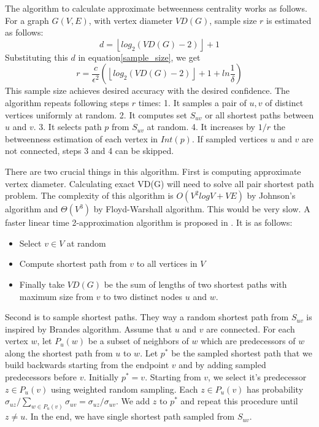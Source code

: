 \documentclass[runningheads,a4paper]{llncs}
\begin{document}
The algorithm to calculate approximate betweenness centrality works as follows. For a graph $G(V,E)$, with vertex diameter $VD(G)$, sample size $r$ is estimated as follows:
$$ d = \left\lfloor{log_{2}(VD(G) - 2)}\right\rfloor + 1$$
Substituting this $d$ in equation\ref{sample_size}, we get
\begin{equation} \label{sample_size_algo}
r = \frac{c}{\epsilon^{2}}(\left\lfloor{log_{2}(VD(G) - 2)}\right\rfloor + 1 + ln\frac{1}{\delta})
\end{equation}
This sample size achieves desired accuracy with the desired confidence. The algorithm repeats following steps $r$ times: 1. It samples a pair of $u,v$ of distinct vertices uniformly at random. 2. It computes set $S_{uv}$ or all shortest paths between $u$ and $v$. 3. It selects path $p$ from $S_{uv}$ at random. 4. It increases by $1/r$ the betweenness estimation of each vertex in $Int(p)$. If sampled vertices $u$ and $v$ are not connected, steps 3 and 4 can be skipped. 

There are two crucial things in this algorithm. First is computing approximate vertex diameter. Calculating exact VD(G) will need to solve all pair shortest  path problem. The complexity of this algorithm is $O(V^{2}logV + VE)$ by Johnson's algorithm\cite{johnson} and $\Theta(V^{3})$ by Floyd-Warshall algorithm. This would be very slow. A faster linear time 2-approximation algorithm is proposed in \cite{matteo}. It is as follows:
\begin{itemize}
\item Select $v \in V$ at random
\item Compute shortest path from $v$ to all vertices in $V$
\item Finally take $VD(G)$ be the sum of lengths of two shortest paths with maximum size from $v$ to two distinct nodes $u$ and $w$. 
\end{itemize}

Second is to sample shortest paths. They way a random shortest path from $S_{uv}$ is inspired by Brandes algorithm\cite{brandes}. Assume that $u$ and $v$ are connected. For each vertex $w$, let $P_{u}(w)$ be a subset of neighbors of $w$ which are predecessors of $w$ along the shortest path from $u$ to $w$. Let $p^{*}$ be the sampled shortest path that we build backwards starting from the endpoint $v$ and by adding sampled predecessors before $v$. Initially $p^{*} = {v}$. Starting from $v$, we select it's predecessor $z \in P_{u}(v)$ using weighted random sampling. Each $z \in P_{u}(v)$ has probability $\sigma_{uz}/\sum_{w \in P_{u}(v)}\sigma_{uv} = \sigma_{uz}/\sigma_{uv}$. We add $z$ to $p^{*}$ and repeat this procedure until $z \neq u$. In the end, we have single shortest path sampled from $S_{uv}$. 
 
\end{document}
